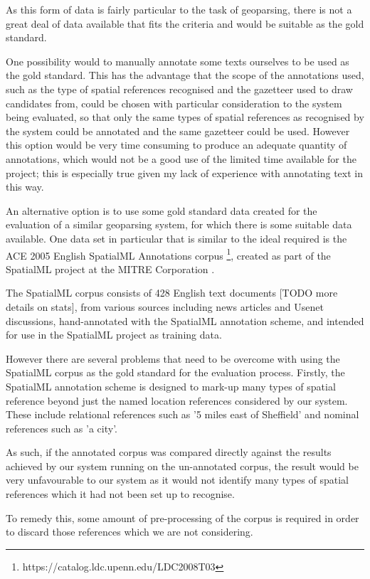 \documentclass[12pt, a4paper]{report}
\begin{document}
As this form of data is fairly particular to the task of geoparsing, there is not a great deal of data available that fits the criteria and would be suitable as the gold standard.

One possibility would to manually annotate some texts ourselves to be used as the gold standard. This has the advantage that the scope of the annotations used, such as the type of spatial references recognised and the gazetteer used to draw candidates from, could be chosen with particular consideration to the system being evaluated, so that only the same types of spatial references as recognised by the system could be annotated and the same gazetteer could be used. However this option would be very time consuming to produce an adequate quantity of annotations, which would not be a good use of the limited time available for the project; this is especially true given my lack of experience with annotating text in this way. 

An alternative option is to use some gold standard data created for the evaluation of a similar geoparsing system, for which there is some suitable data available. One data set in particular that is similar to the ideal required is the ACE 2005 English SpatialML Annotations corpus \footnote{https://catalog.ldc.upenn.edu/LDC2008T03}, created as part of the SpatialML project at the MITRE Corporation \citep{mani2010}.

The SpatialML corpus consists of 428 English text documents [TODO more details on stats], from various sources including news articles and Usenet discussions, hand-annotated with the SpatialML annotation scheme, and intended for use in the SpatialML project as training data.

However there are several problems that need to be overcome with using the SpatialML corpus as the gold standard for the evaluation process. Firstly, the SpatialML annotation scheme is designed to mark-up many types of spatial reference beyond just the named location references considered by our system. These include relational references such as '5 miles east of Sheffield' and nominal references such as 'a city'.

As such, if the annotated corpus was compared directly against the results achieved by our system running on the un-annotated corpus, the result would be very unfavourable to our system as it would not identify many types of spatial references which it had not been set up to recognise.

To remedy this, some amount of pre-processing of the corpus is required in order to discard those references which we are not considering.
\end{document}
